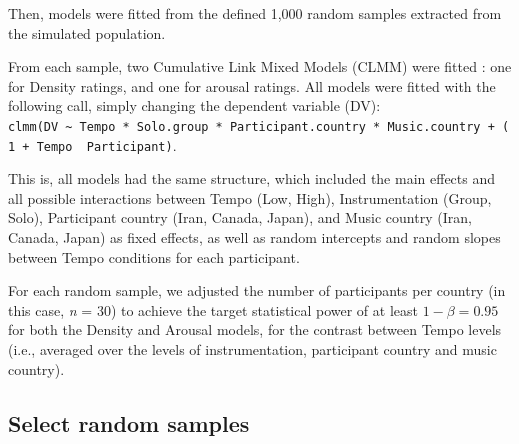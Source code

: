 \documentclass[
  bookmarksnumbered]{article}
\begin{document}
Then, models were fitted from the defined 1,000 random samples extracted from the simulated population.

From each sample, two Cumulative Link Mixed Models (CLMM) were fitted \autocite[see e.g.,][]{taylorRatingNormsShould2022}: one for Density ratings, and one for arousal ratings. All models were fitted with the following call, simply changing the dependent variable (DV): \texttt{clmm(DV\ \textasciitilde{}\ Tempo\ *\ Solo.group\ *\ Participant.country\ *\ Music.country\ +\ (1\ +\ Tempo\ \textbar{}\ Participant)}.

This is, all models had the same structure, which included the main effects and all possible interactions between Tempo (Low, High), Instrumentation (Group, Solo), Participant country (Iran, Canada, Japan), and Music country (Iran, Canada, Japan) as fixed effects, as well as random intercepts and random slopes between Tempo conditions for each participant.

For each random sample, we adjusted the number of participants per country (in this case, \emph{n} = 30) to achieve the target statistical power of at least \(1 - \beta = 0.95\) for both the Density and Arousal models, for the contrast between Tempo levels (i.e., averaged over the levels of instrumentation, participant country and music country).

\hypertarget{select-random-samples}{%
\subsection{Select random samples}\label{select-random-samples}}
\end{document}
